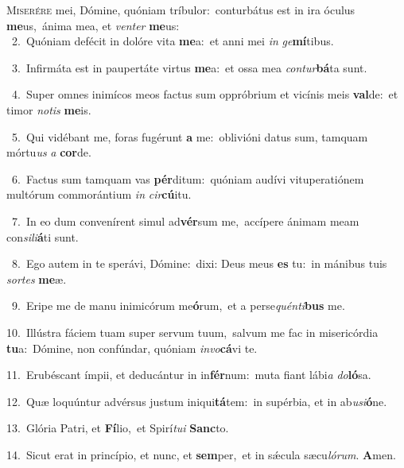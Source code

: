 \lettrine{\initial\textcolor{\initialcolor}{M}}{iserére} mei, Dómine, quóniam tríbulor:~\dagger conturbátus est in ira óculus \textbf{me}\-us,~\star ánima mea, et \textit{ven}\-\textit{ter} \textbf{me}\-us:\\
{\numbfont\textcolor{\numbcolor}{~2.}}~Quóniam defécit in dolóre vita \textbf{me}\-a:~\star et anni mei \textit{in} \textit{ge}\-\textbf{mí}tibus.\par
{\numbfont\textcolor{\numbcolor}{~3.}}~Infirmáta est in paupertáte virtus \textbf{me}\-a:~\star et ossa mea \textit{con}\-\textit{tur}\textbf{bá}ta sunt.\par
{\numbfont\textcolor{\numbcolor}{~4.}}~Super omnes inimícos meos factus sum oppróbrium et vicínis meis \textbf{val}\-de:~\star et timor \textit{no}\-\textit{tis} \textbf{me}\-is.\par
{\numbfont\textcolor{\numbcolor}{~5.}}~Qui vidébant me, foras fugérunt \textbf{a} me:~\star oblivióni datus sum, tamquam mórtu\textit{us} \textit{a} \textbf{cor}\-de.\par
{\numbfont\textcolor{\numbcolor}{~6.}}~Factus sum tamquam vas \textbf{pér}\-ditum:~\star quóniam audívi vituperatiónem multórum commorántium \textit{in} \textit{cir}\-\textbf{cú}itu.\par
{\numbfont\textcolor{\numbcolor}{~7.}}~In eo dum convenírent simul ad\-\textbf{vér}\-sum me,~\star accípere ánimam meam con\-\textit{si}\-\textit{li}\textbf{á}ti sunt.\par
{\numbfont\textcolor{\numbcolor}{~8.}}~Ego autem in te sperávi, Dómine:~\dagger dixi: Deus meus \textbf{es} tu:~\star in mánibus tuis \textit{sor}\-\textit{tes} \textbf{me}\-æ.\par
{\numbfont\textcolor{\numbcolor}{~9.}}~Eripe me de manu inimicórum me\-\textbf{ó}\-rum,~\star et a perse\-\textit{quén}\-\textit{ti}\textbf{bus} me.\par
{\numbfont\textcolor{\numbcolor}{10.}}~Illústra fáciem tuam super servum tuum,~\dagger salvum me fac in misericórdia \textbf{tu}\-a:~\star Dómine, non confúndar, quóniam \textit{in}\-\textit{vo}\textbf{cá}vi te.\par
{\numbfont\textcolor{\numbcolor}{11.}}~Erubéscant ímpii, et deducántur in in\-\textbf{fér}\-num:~\star muta fiant lábi\textit{a} \textit{do}\-\textbf{ló}sa.\par
{\numbfont\textcolor{\numbcolor}{12.}}~Quæ loquúntur advérsus justum iniqui\-\textbf{tá}\-tem:~\star in supérbia, et in ab\-\textit{u}\-\textit{si}\textbf{ó}ne.\par
{\numbfont\textcolor{\numbcolor}{13.}}~Glória Patri, et \textbf{Fí}\-lio,~\star et Spirí\-\textit{tu}\-\textit{i} \textbf{Sanc}\-to.\par
{\numbfont\textcolor{\numbcolor}{14.}}~Sicut erat in princípio, et nunc, et \textbf{sem}\-per,~\star et in sǽcula sæcu\-\textit{ló}\-\textit{rum}. \textbf{A}\-men.\par
